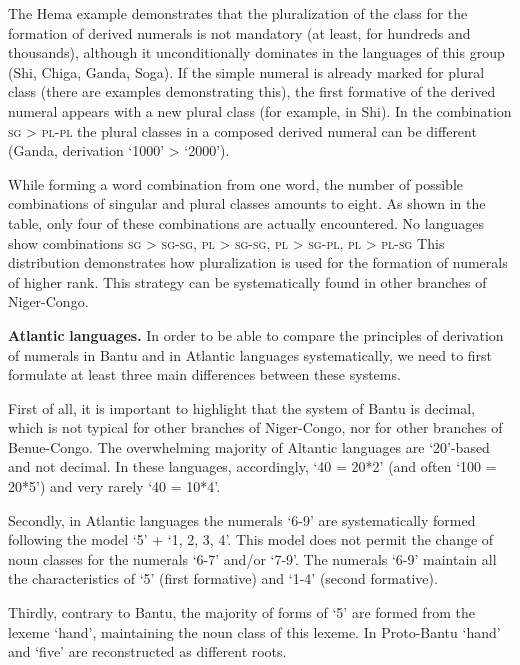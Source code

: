 The Hema example demonstrates that the pluralization of the class for the formation of derived numerals is not mandatory (at least, for hundreds and thousands), although it unconditionally dominates in the languages of this group (Shi, Chiga, Ganda, Soga). If the simple numeral is already marked for plural class (there are examples demonstrating this), the first formative of the derived numeral appears with a new plural class (for example, in Shi). In the combination \textsc{sg} > \textsc{pl}-\textsc{pl} the plural classes in a composed derived numeral can be different (Ganda, derivation ‘1000’ > ‘2000’). 

While forming a word combination from one word, the number of possible combinations of singular and plural classes amounts to eight. As shown in the table, only four of these combinations are actually encountered. No languages show combinations \textsc{sg} > \textsc{sg}-\textsc{sg}, \textsc{pl} > \textsc{sg}-\textsc{sg}, \textsc{pl} > \textsc{sg}-\textsc{pl}, \textsc{pl} > \textsc{pl}-\textsc{sg} This distribution demonstrates how pluralization is used for the formation of numerals of higher rank. This strategy can be systematically found in other branches of Niger-Congo. 

\textbf{Atlantic} \textbf{languages.} In order to be able to compare the principles of derivation of numerals in Bantu and in Atlantic languages systematically, we need to first formulate at least three main differences between these systems.  

First of all, it is important to highlight that the system of Bantu is decimal, which is not typical for other branches of Niger-Congo, nor for other branches of Benue-Congo. The overwhelming majority of Altantic languages are ‘20’-based and not decimal. In these languages, accordingly, ‘40 = 20*2’ (and often ‘100 = 20*5’) and very rarely ‘40 = 10*4’.

Secondly, in Atlantic languages the numerals ‘6-9’ are systematically formed following the model ‘5’ + ‘1, 2, 3, 4’. This model does not permit the change of noun classes for the numerals ‘6-7’ and/or ‘7-9’. The numerals ‘6-9’ maintain all the characteristics of `5' (first formative) and ‘1-4’ (second formative). 

Thirdly, contrary to Bantu, the majority of forms of ‘5’ are formed from the lexeme ‘hand’, maintaining the noun class of this lexeme. In Proto-Bantu ‘hand’ and ‘five’ are reconstructed as different roots. 

